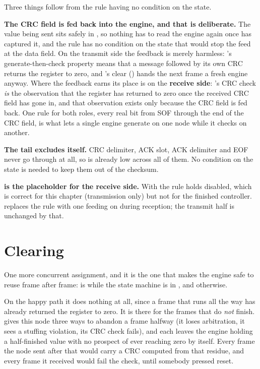 Three things follow from the rule having no condition on the state.

\textbf{The CRC field is fed back into the engine, and that is deliberate.} The value being sent sits
safely in , so nothing has to read the engine again once  has
captured it, and the rule has no condition on the state that would stop the feed at the data field.
On the transmit side the feedback is merely harmless: 's generate-then-check property
means that a message followed by its own CRC returns the register to zero, and 's
clear () hands the next frame a fresh engine anyway. Where the feedback earns
its place is on the \textbf{receive side}: 's CRC check \emph{is} the observation that
the register has returned to zero once the received CRC field has gone in, and that observation exists
only because the CRC field is fed back. One rule for both roles, every real bit from SOF through the
end of the CRC field, is what lets a single engine generate on one node while it checks on another.

\textbf{The tail excludes itself.} CRC delimiter, ACK slot, ACK delimiter and EOF never go through
 at all, so  is already low across all of them. No condition
on the state is needed to keep them out of the checksum.

\textbf{ is the placeholder for the receive side.} With  the rule holds
 disabled, which is correct for this chapter (transmission only) but not for the finished
controller.  replaces the rule with one feeding  on
 during reception; the transmit half is unchanged by that.

\section{Clearing }
\label{c16:sec:crcclear}

One more concurrent assignment, and it is the one that makes the engine safe to reuse frame after
frame:  is  while the state machine is in , and
 otherwise.

On the happy path it does nothing at all, since a frame that runs all the way has already returned
the register to zero. It is there for the frames that do \emph{not} finish.  gives
this node three ways to abandon a frame halfway (it loses arbitration, it sees a stuffing violation,
its CRC check fails), and each leaves the engine holding a half-finished value with no prospect of
ever reaching zero by itself. Every frame the node sent after that would carry a CRC computed from
that residue, and every frame it received would fail the check, until somebody pressed reset.

